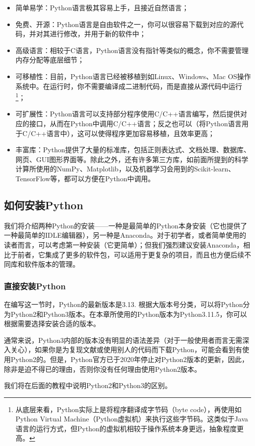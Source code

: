 \begin{itemize}
    \item 简单易学：Python语言极其容易上手，且接近自然语言；
    \item 免费、开源：Python语言是自由软件之一，你可以很容易下载到对应的源代码，并对其进行修改，并用于新的软件中；
    \item 高级语言：相较于C语言，Python语言没有指针等类似的概念，你不需要管理内存分配等底层细节；
    \item 可移植性：目前，Python语言已经被移植到如Linux、Windows、Mac OS操作系统中。在运行时，你不需要编译成二进制代码，而是直接从源代码中运行\footnote{从底层来看，Python实际上是将程序翻译成字节码（byte code），再使用如Python Virtual Machine（Python虚拟机）来执行这些字节码。这类似于Java语言的运行方式，但Python的虚拟机相较于操作系统本身更远，抽象程度更高。}；
    \item 可扩展性：Python语言可以支持部分程序使用C/C++语言编写，然后提供对应的接口，从而在Python中调用C/C++语言；反之也可以（将Python语言用于C/C++语言中），这可以使得程序更加容易移植，且效率更高；
    \item 丰富库：Python提供了大量的标准库，包括正则表达式、文档处理、数据库、网页、GUI图形界面等。除此之外，还有许多第三方库，如前面所提到的科学计算所使用的NumPy、Matplotlib，以及机器学习会用到的Scikit-learn、TensorFlow等，都可以方便在Python中调用。
\end{itemize}

\subsection{如何安装Python}\label{subsec:安装Python-如何安装Python}

我们将介绍两种Python的安装——一种是最简单的Python本身安装（它也提供了一种最简单的IDLE编辑器），另一种是Anaconda。对于初学者，或者简单使用的读者而言，可以考虑第一种安装（它更简单）；但我们强烈建议安装Anaconda，相比于前者，它集成了更多的软件包，可以适用于更复杂的项目，而且也方便后续不同库和软件版本的管理。

\subsubsection{直接安装Python}

\begin{attention}
    在编写这一节时，Python的最新版本是3.13. 根据大版本号分类，可以将Python分为Python2和Python3版本。在本章所使用的Python版本为Python3.11.5，你可以根据需要选择安装合适的版本。

    通常来说，Python3内部的版本没有明显的语法差异（对于一般使用者而言无需深入关心），如果你是为复现文献或使用别人的代码而下载Python，可能会看到有使用Python2的。但是，Python官方已于2020年停止对Python2版本的更新，因此，除非是迫不得已的理由，否则你没有任何理由使用Python2版本。

    我们将在后面的教程中说明Python2和Python3的区别。
\end{attention}


